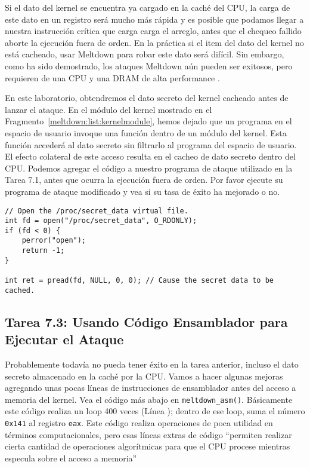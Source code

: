 Si el dato del kernel se encuentra ya cargado en la caché del CPU, la carga de este dato en un registro será mucho más rápida y es posible que podamos llegar a nuestra instrucción crítica que carga carga el arreglo, antes que el chequeo fallido aborte la ejecución fuera de orden. En la práctica si el item del dato del kernel no está cacheado, usar Meltdown para robar este dato será difícil. Sin embargo, como ha sido demostrado, los ataques Meltdown aún pueden ser exitosos, pero requieren de una CPU y una DRAM de alta performance \cite{meltdowdemo}.

En este laboratorio, obtendremos el dato secreto del kernel cacheado antes de lanzar el ataque.
En el módulo del kernel mostrado en el Fragmento~\ref{meltdown:list:kernelmodule}, hemos dejado que un programa en el espacio de usuario invoque una función dentro de un módulo del kernel. Esta función accederá al dato secreto sin filtrarlo al programa del espacio de usuario. El efecto colateral de este acceso resulta en el cacheo de dato secreto dentro del CPU. Podemos agregar el código a nuestro programa de ataque utilizado en la Tarea 7.1, antes que ocurra la ejecución fuera de orden.
Por favor ejecute su programa de ataque modificado y vea si su tasa de éxito ha mejorado o no.

\begin{lstlisting}
// Open the /proc/secret_data virtual file.
int fd = open("/proc/secret_data", O_RDONLY);
if (fd < 0) {
    perror("open");
    return -1;
}

int ret = pread(fd, NULL, 0, 0); // Cause the secret data to be cached.
\end{lstlisting}



\subsection{Tarea 7.3: Usando Código Ensamblador para Ejecutar el Ataque}

Probablemente todavía no pueda tener éxito en la tarea anterior, incluso el dato secreto almacenado en la caché por la CPU.
Vamos a hacer algunas mejoras agregando unas pocas líneas de instrucciones de ensamblador antes del acceso a memoria del kernel. Vea el código más abajo en \texttt{meltdown\_asm()}. Básicamente este código realiza un loop 400 veces (Línea   ); dentro de ese loop, suma el número \texttt{0x141} al registro \texttt{eax}. Este código realiza operaciones de poca utilidad en términos computacionales, pero esas líneas extras de código ``permiten realizar cierta cantidad de operaciones algorítmicas para que el CPU procese mientras especula sobre el acceso a memoria''~\cite{boldin}


